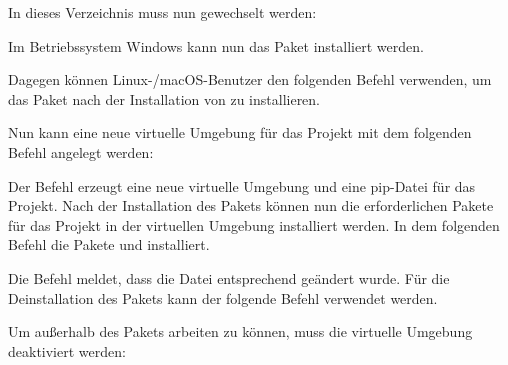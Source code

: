 \medskip


\medskip

In dieses Verzeichnis muss nun gewechselt werden:

\medskip


\medskip

Im Betriebssystem Windows kann nun das Paket  installiert werden.

\medskip


\medskip

Dagegen können Linux-/macOS-Benutzer den folgenden Befehl verwenden, um das Paket  nach der Installation von  zu installieren.

\medskip


\medskip


Nun kann eine neue virtuelle Umgebung für das Projekt mit dem folgenden Befehl angelegt werden:

\medskip


\medskip

Der Befehl erzeugt eine neue virtuelle Umgebung  und eine pip-Datei  für das Projekt. Nach der Installation des Pakets  können nun die erforderlichen Pakete für das Projekt in der virtuellen Umgebung installiert werden. In dem folgenden Befehl die Pakete  und  installiert.
	

\medskip



\medskip

Die Befehl meldet, dass die Datei  entsprechend geändert wurde. Für die Deinstallation des Pakets kann der folgende Befehl verwendet werden.

\medskip


\medskip

Um außerhalb des Pakets arbeiten zu können, muss die virtuelle Umgebung deaktiviert werden:

\medskip


